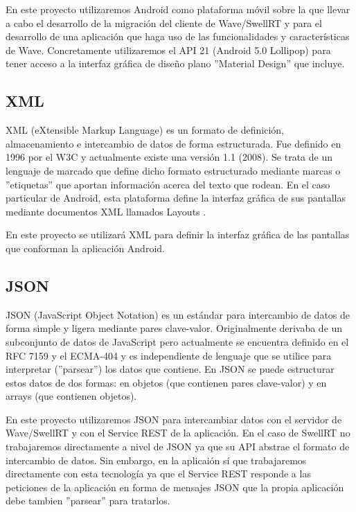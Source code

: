 	En este proyecto utilizaremos Android como plataforma móvil sobre la que llevar a cabo el desarrollo de la migración del cliente de Wave/SwellRT y para el desarrollo de una aplicación que haga uso de las funcionalidades y características de Wave. Concretamente utilizaremos el API 21 (Android 5.0 Lollipop) para tener acceso a la interfaz gráfica de diseño plano ''Material Design'' que incluye.
    
    \subsection{XML}\label{ssec:xml}
    
	XML \cite{ref:xml} (eXtensible Markup Language) es un formato de definición, almacenamiento e intercambio de datos de forma estructurada. Fue definido en 1996 por el W3C y actualmente existe una versión 1.1 (2008). Se trata de un lenguaje de marcado que define dicho formato estructurado mediante marcas o ''etiquetas'' que aportan información acerca del texto que rodean. En el caso particular de Android, esta plataforma define la interfaz gráfica de sus pantallas mediante documentos XML llamados Layouts \cite{ref:android_layout}.
	
	En este proyecto se utilizará XML para definir la interfaz gráfica de las pantallas que conforman la aplicación Android. 
    
    \subsection{JSON}\label{ssec:json}
    
	JSON \cite{ref:json} (JavaScript Object Notation) es un estándar para intercambio de datos de forma simple y ligera mediante pares clave-valor. Originalmente derivaba de un subconjunto de datos de JavaScript pero actualmente se encuentra definido en el RFC 7159 y el ECMA-404 y es independiente de lenguaje que se utilice para interpretar (''parsear'') los datos que contiene. En JSON se puede estructurar estos datos de dos formas: en objetos (que contienen pares clave-valor) y en arrays (que contienen objetos).
	
	En este proyecto utilizaremos JSON para intercambiar datos con el servidor de Wave/SwellRT y con el Service REST de la aplicación. En el caso de SwellRT no trabajaremos directamente a nivel de JSON ya que su API abstrae el formato de intercambio de datos. Sin embargo, en la aplicaión sí que trabajaremos directamente con esta tecnología ya que el Service REST responde a las peticiones de la aplicación en forma de mensajes JSON que la propia aplicación debe tambien ''parsear'' para tratarlos.    
    
